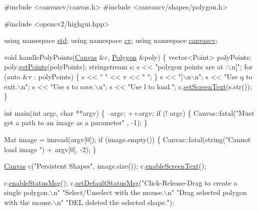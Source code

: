 \begin{DoxyCode}
\textcolor{preprocessor}{#include <canvascv/canvas.h>}
\textcolor{preprocessor}{#include <canvascv/shapes/polygon.h>}

\textcolor{preprocessor}{#include <opencv2/highgui.hpp>}

\textcolor{keyword}{using namespace }\hyperlink{namespacestd}{std};
\textcolor{keyword}{using namespace }\hyperlink{namespacecv}{cv};
\textcolor{keyword}{using namespace }\hyperlink{namespacecanvascv}{canvascv};

\textcolor{keywordtype}{void} handlePolyPoints(\hyperlink{classcanvascv_1_1Canvas}{Canvas} &c, \hyperlink{classcanvascv_1_1Polygon}{Polygon} &poly)
\{
    vector<Point> polyPoints;
    poly.\hyperlink{classcanvascv_1_1Polygon_ada0df457225c06769d7a90d71f58ed7f}{getPoints}(polyPoints);
    stringstream s;
    s <<  \textcolor{stringliteral}{"polygon points are at :\(\backslash\)n["};
    \textcolor{keywordflow}{for} (\textcolor{keyword}{auto} &v : polyPoints)
    \{
        s << \textcolor{stringliteral}{" "} << v << \textcolor{stringliteral}{" "};
    \}
    s <<  \textcolor{stringliteral}{"]\(\backslash\)n\(\backslash\)n"};
    s <<  \textcolor{stringliteral}{"Use q to exit.\(\backslash\)n"};
    s <<  \textcolor{stringliteral}{"Use s to save.\(\backslash\)n"};
    s <<  \textcolor{stringliteral}{"Use l to load."};
    c.\hyperlink{classcanvascv_1_1Canvas_aaedea276b82a8a4cfc0895ae81113cfd}{setScreenText}(s.str());
\}

\textcolor{keywordtype}{int} main(\textcolor{keywordtype}{int} argc, \textcolor{keywordtype}{char} **argv)
\{
    --argc;
    ++argv;
    \textcolor{keywordflow}{if} (! argc)
    \{
        Canvas::fatal(\textcolor{stringliteral}{"Must get a path to an image as a parameter"} , -1);
    \}

    Mat image = imread(argv[0]);
    \textcolor{keywordflow}{if} (image.empty())
    \{
        Canvas::fatal(\textcolor{keywordtype}{string}(\textcolor{stringliteral}{"Cannot load image "}) + argv[0], -2);
    \}

    \hyperlink{classcanvascv_1_1Canvas}{Canvas} c(\textcolor{stringliteral}{"Persistent Shapes"}, image.size());
    c.\hyperlink{classcanvascv_1_1Canvas_ae68d3277e738d349232400b38f0e5f9e}{enableScreenText}();

    c.\hyperlink{classcanvascv_1_1Canvas_a402c43a42c0089c48a96e5303c1c1fe8}{enableStatusMsg}();
    c.\hyperlink{classcanvascv_1_1Canvas_a14828809edd29d789170284a86f16f23}{setDefaultStatusMsg}(\textcolor{stringliteral}{"Click-Release-Drag to create a single polygon.\(\backslash\)n"}
                          \textcolor{stringliteral}{"Select/Unselect with the mouse.\(\backslash\)n"}
                          \textcolor{stringliteral}{"Drag selected polygon with the mouse.\(\backslash\)n"}
                          \textcolor{stringliteral}{"DEL deleted the selected shape."});


\end{DoxyCode}
